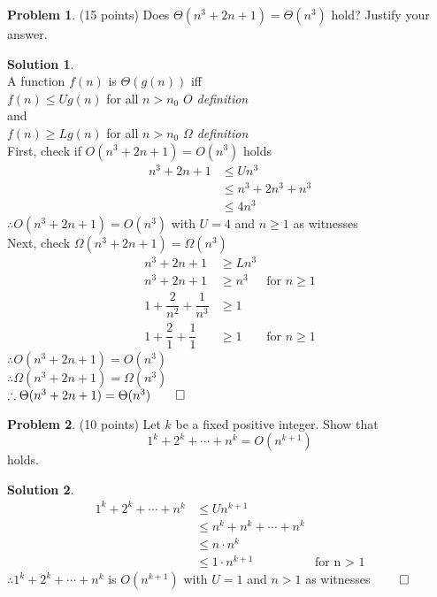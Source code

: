 \documentclass{article}
\theoremstyle{definition}
\newtheorem{problem}{Problem}
\newtheorem*{solution}{Solution}
\begin{document}
\begin{problem} (15 points) 
Does $\Theta(n^3+2n+1) = \Theta(n^3)$ hold?  Justify your answer.
\end{problem}
\begin{solution}\ \\
A function $f(n)$ is $\Theta(g(n))$ iff \\ 
\hspace{10pt} $f(n) \le U g(n)$ for all $n>n_0$ \textit{$O$ definition} \\
and\\
\hspace{10pt} $f(n) \ge L g(n)$ for all $n>n_0$ \textit{$\Omega$ definition} \\
First, check if $O(n^3+2n+1) = O(n^3)$ holds
\begin{align*}
    n^3+2n+1 &\le U n^3 \\
    &\le n^3 + 2 n^3 + n^3\\
    &\le 4n^3
\end{align*}
$\therefore O(n^3+2n+1) = O(n^3)$ with $U=4$ and $n \ge 1$ as witnesses \\
Next, check $\Omega(n^3+2n+1) = \Omega(n^3)$
\begin{align*}
    n^3+2n+1 &\ge L n^3 \\
    n^3+2n+1 &\ge n^3 &\text{for $n \ge 1$}\\
    1 + \dfrac{2}{n^2} + \dfrac{1}{n^3} &\ge 1\\
    1 + \dfrac{2}{1} + \dfrac{1}{1} &\ge 1&\text{for $n \ge 1$}
\end{align*}
$\therefore O(n^3+2n+1) = O(n^3)$ \\
$\therefore \Omega(n^3+2n+1) = \Omega(n^3)$\\
$\therefore \Theta(n^3+2n+1) = \Theta(n^3) \qed$
\end{solution}

\begin{problem} (10 points)
Let $k$ be a fixed positive integer. Show that 
$$ 1^k+2^k+\cdots + n^k  = O(n^{k+1}) $$ holds.
\end{problem}
\begin{solution}
\begin{align*}
  1^k+2^k+\cdots + n^k  &\le U n^{k+1} \\
  &\le n^{k} + n^{k} + \cdots  + n^{k} \\
  &\le n \cdot n^{k} \\
  &\le 1 \cdot n^{k+1} &\text{for n $>$ 1}
\end{align*}
$\therefore 1^k+2^k+\cdots + n^k$ is $O(n^{k+1})$ with $U = 1$ and $n > 1$ as witnesses $\qed$
\end{solution}
\end{document}
